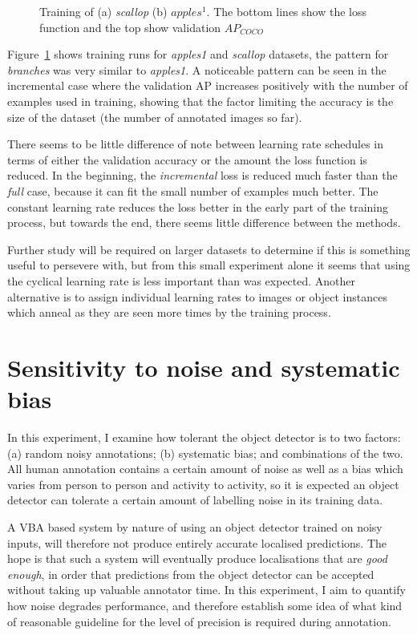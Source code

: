 \begin{figure}[h]
\begin{subfigure}[t]{0.5\linewidth}
  \caption{}
\end{subfigure}
  \caption{Training of (a) \emph{scallop} (b) $apples^1$. The bottom lines show the loss function and the top show validation $AP_{COCO}$}  
  \label{fig:datasets_lr}
\end{figure}

Figure~\ref{fig:datasets_lr} shows training runs for \emph{apples1} and \emph{scallop} datasets, the pattern for \emph{branches} was very similar to \emph{apples1}. A noticeable pattern can be seen in the incremental case where the validation \gls{AP} increases positively with the number of examples used in training, showing that the factor limiting the accuracy is the size of the dataset (the number of annotated images so far).

There seems to be little difference of note between learning rate schedules in terms of either the validation accuracy or the amount the loss function is reduced. In the beginning, the \emph{incremental} loss is reduced much faster than the \emph{full} case, because it can fit the small number of examples much better. The constant learning rate reduces the loss better in the early part of the training process, but towards the end, there seems little difference between the methods. 

Further study will be required on larger datasets to determine if this is something useful to persevere with, but from this small experiment alone it seems that using the cyclical learning rate is less important than was expected. Another alternative is to assign individual learning rates to images or object instances which anneal as they are seen more times by the training process.

\section{Sensitivity to noise and systematic bias}
\label{sec:noise_sensitivity}

In this experiment, I examine how tolerant the object detector is to two factors: (a) random noisy annotations; (b) systematic bias; and combinations of the two. All human annotation contains a certain amount of noise as well as a bias which varies from person to person and activity to activity, so it is expected an object detector can tolerate a certain amount of labelling noise in its training data. 

A \gls{VBA} based system by nature of using an object detector trained on noisy inputs, will therefore not produce entirely accurate localised predictions. The hope is that such a system will eventually produce localisations that are \emph{good enough}, in order that predictions from the object detector can be accepted without taking up valuable annotator time. In this experiment, I aim to quantify how noise degrades performance, and therefore establish some idea of what kind of reasonable guideline for the level of precision is required during annotation.

